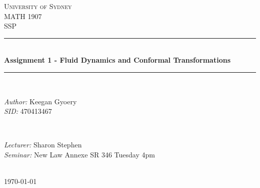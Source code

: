 \documentclass[a4paper]{article}
\begin{document}
\begin{titlepage}

\newcommand{\HRule}{\rule{\linewidth}{0.5mm}} %

\center %
 
\textsc{\LARGE University of Sydney}\\[1.5cm] %
\textsc{\Large MATH 1907}\\[0.5cm] %
\textsc{\large SSP}\\[0.5cm] %

\HRule \\[0.4cm]
{ \huge \bfseries Assignment 1 - Fluid Dynamics and Conformal Transformations}\\[0.4cm] %
\HRule \\[1.5cm]

\begin{minipage}{0.4\textwidth}
\begin{flushleft} \large
\emph{Author:}
Keegan Gyoery %
\\
\emph{SID:}
470413467
\end{flushleft}
\end{minipage}
~
\begin{minipage}{0.4\textwidth}
\begin{flushright} \large
\emph{Lecturer:} 
Sharon Stephen %
\\
\emph{Seminar:}
New Law Annexe SR 346
Tuesday 4pm
\end{flushright}
\end{minipage}\\[4cm]

{\large \today}\\[3cm] %

\vfill %

\end{titlepage}

\end{document}
